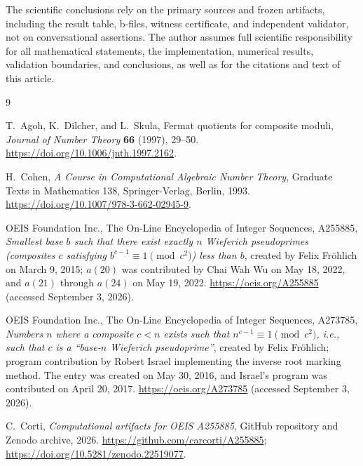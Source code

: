 \documentclass[11pt]{article}
\begin{document}
The scientific conclusions rely on the primary sources and frozen artifacts,
including the result table, b-files, witness certificate, and independent
validator, not on conversational assertions.  The author assumes full
scientific responsibility for all mathematical statements, the
implementation, numerical results, validation boundaries, and conclusions,
as well as for the citations and text of this article.

\clearpage
\begin{thebibliography}{9}
\sloppy
\raggedright

T.~Agoh, K.~Dilcher, and L.~Skula,
Fermat quotients for composite moduli,
\emph{Journal of Number Theory} \textbf{66} (1997), 29--50.
\url{https://doi.org/10.1006/jnth.1997.2162}.

H.~Cohen,
\emph{A Course in Computational Algebraic Number Theory},
Graduate Texts in Mathematics 138, Springer-Verlag, Berlin, 1993.
\url{https://doi.org/10.1007/978-3-662-02945-9}.

OEIS Foundation Inc.,
The On-Line Encyclopedia of Integer Sequences, A255885,
\emph{Smallest base $b$ such that there exist exactly $n$ Wieferich
pseudoprimes (composites $c$ satisfying
$b^{c-1}\equiv1\pmod{c^2}$) less than $b$},
created by Felix Fr\"ohlich on March 9, 2015; $a(20)$ was contributed by
Chai Wah Wu on May 18, 2022, and $a(21)$ through $a(24)$ on May 19, 2022.
\url{https://oeis.org/A255885} (accessed September 3, 2026).

OEIS Foundation Inc.,
The On-Line Encyclopedia of Integer Sequences, A273785,
\emph{Numbers $n$ where a composite $c<n$ exists such that
$n^{c-1}\equiv1\pmod{c^2}$, i.e., such that $c$ is a ``base-$n$ Wieferich
pseudoprime''}, created by Felix Fr\"ohlich; program contribution by Robert
Israel implementing the inverse root marking method.  The entry was created
on May 30, 2016, and Israel's program was contributed on April 20, 2017.
\url{https://oeis.org/A273785} (accessed September 3, 2026).

C.~Corti,
\emph{Computational artifacts for OEIS A255885}, GitHub repository and Zenodo
archive, 2026.
\url{https://github.com/carcorti/A255885};
\url{https://doi.org/10.5281/zenodo.22519077}.

\end{thebibliography}
\end{document}
